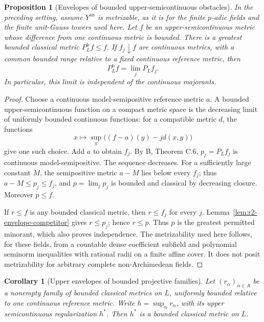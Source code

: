 \documentclass[11pt,a4paper]{article}
\numberwithin{equation}{section}
\newtheorem{proposition}[theorem]{Proposition}
\newtheorem{corollary}[theorem]{Corollary}
\theoremstyle{definition}
\theoremstyle{remark}
\newcommand{\an}{\mathrm{an}}
\begin{document}
\begin{proposition}[Envelopes of bounded upper-semicontinuous obstacles]
\label{prop:r2-usc-obstacle}
In the preceding setting, assume $Y^{\an}$ is metrizable, as it is
for the finite $p$-adic fields and the finite unit-Gauss towers used
here. Let $f$ be an upper-semicontinuous metric whose difference from
one continuous metric is bounded. There is a greatest bounded
classical metric $P_L^{\mathrm{b}}f\leq f$. If $f_j\downarrow f$ are
continuous metrics, with a common bounded range relative to a fixed
continuous reference metric, then
\[
 P_L^{\mathrm{b}}f=\lim_j P_L f_j.
\]
In particular, this limit is independent of the continuous majorants.
\end{proposition}

\begin{proof}
Choose a continuous model-semipositive reference metric $a$. A bounded
upper-semicontinuous function on a compact metric space is the
decreasing limit of uniformly bounded continuous functions: for a
compatible metric $d$, the functions
\[
 x\longmapsto\sup_y\bigl((f-a)(y)-j d(x,y)\bigr)
\]
give one such choice. Add $a$ to obtain $f_j$.
By \textup{B}, Theorem C.6, $p_j=P_L f_j$ is continuous
model-semipositive. The sequence decreases. For a sufficiently large
constant $M$, the semipositive metric $a-M$ lies below every $f_j$;
thus $a-M\leq p_j\leq f_j$, and $p=\lim_jp_j$ is bounded and
classical by decreasing closure. Moreover $p\leq f$.

If $r\leq f$ is any bounded classical metric, then $r\leq f_j$ for
every $j$. Lemma~\ref{lem:r2-envelope-competitor} gives $r\leq p_j$;
hence $r\leq p$. Thus $p$ is the greatest permitted minorant, which
also proves independence. The metrizability used here follows, for
these fields, from a countable dense coefficient subfield and
polynomial seminorm inequalities with rational radii on a finite
affine cover. It does not posit metrizability for arbitrary complete
non-Archimedean fields.
\end{proof}

\begin{corollary}[Upper envelopes of bounded projective families]
\label{cor:r2-projective-upper-envelope}
Let $(r_\alpha)_{\alpha\in A}$ be a nonempty family of bounded
classical metrics on $L$, uniformly bounded relative to one continuous
reference metric. Write $h=\sup_\alpha r_\alpha$, with its upper
semicontinuous regularization $h^*$. Then $h^*$ is a bounded classical
metric on $L$.
\end{corollary}
\end{document}

